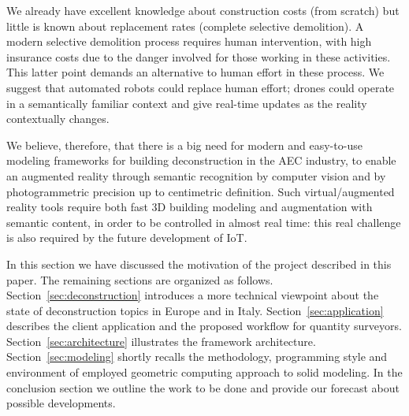 We already have excellent knowledge about construction costs (from scratch) but little is known about replacement rates (complete selective demolition). A modern selective demolition process requires human intervention, with high insurance costs due to the danger involved for those working in these activities. This latter point demands an alternative to human effort in these process. We suggest that automated robots could replace human effort; drones could operate in a semantically familiar context and give real-time updates as the reality contextually changes. 

We believe, therefore, that there is a big need for modern and easy-to-use modeling frameworks for building deconstruction in the AEC industry, to enable an augmented reality through semantic recognition by computer vision and by photogrammetric precision up to centimetric definition. Such virtual/augmented reality tools require both fast 3D building modeling and augmentation with semantic content, in order to be controlled in almost real time: this real challenge is also required by the future development of IoT. 	  
 
In this section we have discussed the motivation of the project described in this paper. The remaining sections are organized as follows.
Section~\ref{sec:deconstruction} introduces a more technical viewpoint about the state of deconstruction topics in Europe and in Italy.
Section~\ref{sec:application} describes the client application and the proposed workflow for quantity surveyors.
Section~\ref{sec:architecture} illustrates the framework architecture. 
Section~\ref{sec:modeling} shortly recalls the methodology, programming style and environment of employed geometric computing approach to solid modeling.
In the conclusion section we outline the work to be done and provide our forecast about possible developments.
